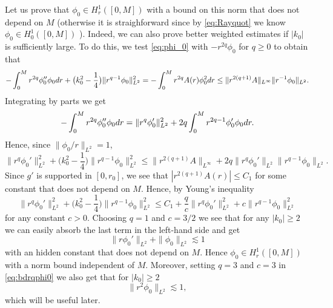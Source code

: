 \documentclass[11pt,reqno]{amsproc}
\def\dd{{\rm d}}
\theoremstyle{definition}
\theoremstyle{definition}
\numberwithin{equation}{section}
\begin{document}
Let us prove that $\phi_0\in H^1_r([0,M])$ with a bound on this norm that does not depend on $M$ (otherwise it is straighforward since  by \cref{eq:Rayquot} we know $\phi_0\in H^1_0([0,M])$ ). Indeed, we can also prove better weighted estimates if $|k_0|$ is sufficiently large. To do this, we test \cref{eq:phi_0} with $-r^{2q}\phi_0$ for $q\geq 0$ to  obtain that 
\begin{equation}
    -\int_0^M r^{2q}\phi_0''\phi_0\dd r+\big(k_0^2-\frac14\big)\|r^{q-1}\phi_0\|^2_{L^2}=-\int_0^M r^{2q}A(r)\phi_0^2\dd r\leq \|r^{2(q+1)}A\|_{L^\infty}\|r^{-1}\phi_0\|_{L^2}.
\end{equation}
Integrating by parts we get
\begin{equation}
  -\int_0^M r^{2q}\phi_0''\phi_0\dd r=\|r^q\phi_0'\|_{L^2}^2+2q\int_0^Mr^{2q-1}\phi_0'\phi_0 \dd r.
\end{equation}
Hence, since $\|\phi_0/r\|_{L^2}=1$,
\begin{equation}
\|r^{q}\phi_0'\|_{L^2}^2+\big(k_0^2-\frac14\big)\|r^{q-1}\phi_0\|^2_{L^2}\leq \|r^{2(q+1)}A\|_{L^\infty}+2q\|r^q\phi_0'\|_{L^2}\|r^{q-1}\phi_0\|_{L^2}.
\end{equation}
Since $g'$ is supported in $[0,r_0]$, we see that $|r^{2(q+1)}A(r)|\leq C_1$ for some constant that does not depend on $M$. Hence, by Young's inequality
\begin{equation}
\label{eq:bdrqphi0}
\|r^{q}\phi_0'\|_{L^2}^2+\big(k_0^2-\frac14\big)\|r^{q-1}\phi_0\|^2_{L^2}\leq C_1+\frac{q}{c}\|r^q\phi_0'\|_{L^2}^2+c\|r^{q-1}\phi_0\|_{L^2}^2
\end{equation}
for any constant $c>0$. Choosing $q=1$ and $c=3/2$ we see that for any $|k_0|\geq 2$ we can easily absorb the last term in the left-hand side and get 
\begin{equation}
    \label{bd:phi0L2}
\|r\phi_0'\|_{L^2}+\|\phi_0\|_{L^2}\lesssim 1
\end{equation}
with an hidden constant that does not depend on $M$. Hence $\phi_0\in H^1_r([0,M])$ with a norm bound independent of $M$. Moreover, setting $q=3$ and $c=3$ in \eqref{eq:bdrqphi0} we also get that for $|k_0|\geq 2$
\begin{equation}
    \label{bd:rqphi0}
    \|r^2\phi_0\|_{L^2}\lesssim 1,
\end{equation}
which will be useful later.
\medskip 
\end{document}
